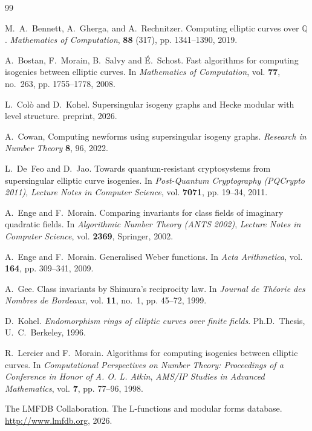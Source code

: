 \documentclass{amsart}
\newcommand{\QQ}{\mathbb{Q}}
\begin{document}
\begin{thebibliography}{99}

  M.~A.~Bennett, A.~Gherga, and A.~Rechnitzer.
  Computing elliptic curves over $\QQ$.
  {\it Mathematics of Computation}, {\bf 88} (317), pp. 1341--1390, 2019.

  A.~Bostan, F.~Morain, B.~Salvy and \'E.~Schost.
  Fast algorithms for computing isogenies between elliptic curves.
  In {\it Mathematics of Computation}, vol. {\bf 77}, no.~263, pp. 1755--1778, 2008.

  L.~Colò and D.~Kohel.
  Supersingular isogeny graphs and Hecke modular with level structure.
  preprint, 2026.
  
  A.~Cowan,
  Computing newforms using supersingular isogeny graphs.
  {\it Research in Number Theory} {\bf 8}, 96, 2022.
  
  L.~De~Feo and D.~Jao.
  Towards quantum-resistant cryptosystems from supersingular elliptic curve isogenies.
  In {\it Post-Quantum Cryptography (PQCrypto 2011)},
  {\it Lecture Notes in Computer Science}, vol. {\bf 7071}, pp. 19--34, 2011.

  A.~Enge and F.~Morain.
  Comparing invariants for class fields of imaginary quadratic fields.
  In {\it Algorithmic Number Theory (ANTS 2002)},
  {\it Lecture Notes in Computer Science}, vol. {\bf 2369}, Springer, 2002.

  A.~Enge and F.~Morain.
  Generalised Weber functions.
  In {\it Acta Arithmetica}, vol. {\bf 164}, pp. 309--341, 2009.

  A.~Gee. 
  Class invariants by Shimura's reciprocity law.
  In {\it Journal de Th{\'e}orie des Nombres de Bordeaux}, vol. {\bf 11}, no.~1, pp. 45--72, 1999.

  D.~Kohel.
  {\it Endomorphism rings of elliptic curves over finite fields}.
  Ph.D.~Thesis, U.~C.~Berkeley, 1996.

  R.~Lercier and F.~Morain.
  Algorithms for computing isogenies between elliptic curves.
  In {\it Computational Perspectives on Number Theory:
  Proceedings of a Conference in Honor of A. O. L. Atkin},
  {\it AMS/IP Studies in Advanced Mathematics}, vol. {\bf  7},
  pp. 77--96, 1998. 

  The LMFDB Collaboration.
  The L-functions and modular forms database.
  \url{http://www.lmfdb.org}, 2026.


\end{thebibliography}
\end{document}
